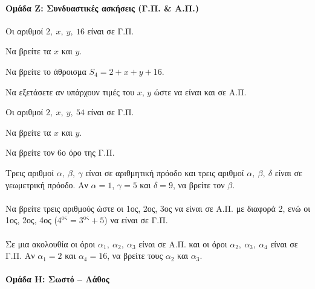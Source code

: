 \documentclass[11pt,a4paper,modern]{FFExercises}
\begin{document}

\paragraph{Ομάδα Ζ: Συνδυαστικές ασκήσεις (Γ.Π. \& Α.Π.)}

\askhsh
Οι αριθμοί $2,\ x,\ y,\ 16$ είναι σε Γ.Π.
\begin{alist}
  \item Να βρείτε τα $x$ και $y$.
  \item Να βρείτε το άθροισμα $S_4 = 2 + x + y + 16$.
  \item Να εξετάσετε αν υπάρχουν τιμές του $x$, $y$ ώστε να είναι και σε Α.Π.
\end{alist}

\askhsh
Οι αριθμοί $2,\ x,\ y,\ 54$ είναι σε Γ.Π.
\begin{alist}
  \item Να βρείτε τα $x$ και $y$.
  \item Να βρείτε τον 6ο όρο της Γ.Π.
\end{alist}

\askhsh
Τρεις αριθμοί $\alpha,\ \beta,\ \gamma$ είναι σε αριθμητική πρόοδο και τρεις αριθμοί $\alpha,\ \beta,\ \delta$ είναι σε γεωμετρική πρόοδο. Αν $\alpha = 1$, $\gamma = 5$ και $\delta = 9$, να βρείτε τον $\beta$.\\\\

\askhsh
Να βρείτε τρεις αριθμούς ώστε οι 1ος, 2ος, 3ος να είναι σε Α.Π. με διαφορά 2, ενώ οι 1ος, 2ος, 4ος ($4^{\text{ος}} = 3^{\text{ος}} + 5$) να είναι σε Γ.Π.\\\\

\askhsh
Σε μια ακολουθία οι όροι $\alpha_1,\ \alpha_2,\ \alpha_3$ είναι σε Α.Π. και οι όροι $\alpha_2,\ \alpha_3,\ \alpha_4$ είναι σε Γ.Π. Αν $\alpha_1 = 2$ και $\alpha_4 = 16$, να βρείτε τους $\alpha_2$ και $\alpha_3$.


\paragraph{Ομάδα Η: Σωστό -- Λάθος}
\end{document}
